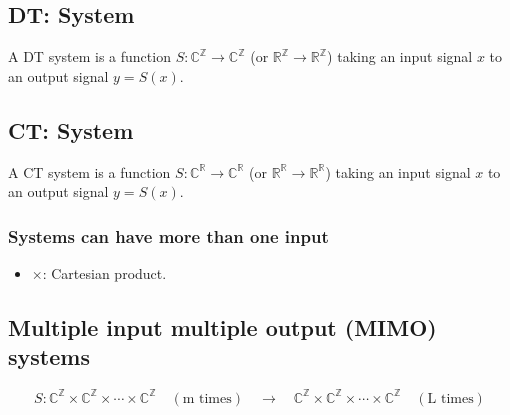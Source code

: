 \subsection{DT: System}
\begin{definition}
    A DT system is a function \( S: \mathbb{C}^{\mathbb{Z}} \to \mathbb{C}^{\mathbb{Z}} \) (or \( \mathbb{R}^{\mathbb{Z}} \to \mathbb{R}^{\mathbb{Z}} \)) taking an input signal \( x \) to an output signal \( y = S(x) \).
\end{definition}

\begin{example}
\end{example}

\subsection{CT: System}
\begin{definition}
    A CT system is a function \( S: \mathbb{C}^{\mathbb{R}} \to \mathbb{C}^{\mathbb{R}} \) (or \( \mathbb{R}^{\mathbb{R}} \to \mathbb{R}^{\mathbb{R}} \)) taking an input signal \( x \) to an output signal \( y = S(x) \).
\end{definition}

\begin{example}
\end{example}

\subsubsection{Systems can have more than one input}
\begin{example}
    \begin{itemize}
        \item $\times$: Cartesian product.
    \end{itemize}


\end{example}

\subsection{Multiple input multiple output (MIMO) systems}
\begin{definition}
    \begin{equation*}
        S: \mathbb{C}^{\mathbb{Z}} \times \mathbb{C}^{\mathbb{Z}} \times \cdots \times \mathbb{C}^{\mathbb{Z}} \quad (\text{m times}) \quad \to \quad \mathbb{C}^{\mathbb{Z}} \times \mathbb{C}^{\mathbb{Z}} \times \cdots \times \mathbb{C}^{\mathbb{Z}} \quad (\text{L times})
    \end{equation*}
\end{definition}

